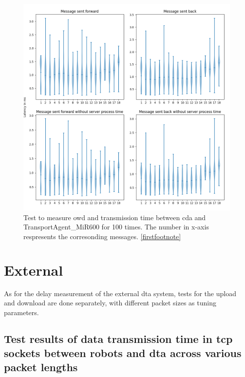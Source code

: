 \begin{figure}[htb]
    \centering
    \includegraphics[width=\textwidth]{figures/tests/usecase/violin_CoordinatorAgent_to_TransportAgent_MiR600.png}\hfill 
    \caption{Test to measure \gls{owd} and transmission time between \gls{cda} and 
    TransportAgent\_MiR600 for 100 times. The number in x-axis respresents the 
    corresonding messages. \protect\ref{firstfootnote}}
    \label{fig: violin-CDA-T600}
\end{figure}




\section{External}\label{chap: Result-External}
As for the delay measurement of the external \gls{dta} system, tests for the 
upload and download are done separately, with different packet sizes as tuning 
parameters. 


\subsection{Test results of data transmission 
time in \gls{tcp} sockets between robots and \gls{dta} across 
various packet lengths} \label{chap: Result-RCP-DTA}

